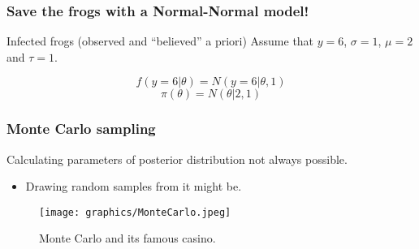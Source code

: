 \documentclass{beamer}
\newcommand{\1}{\ensuremath{\mathbf{1}}}
\begin{document}
%
%
%
\begin{frame}\frametitle{Save the frogs with a Normal-Normal model!}
	\begin{block}{Infected frogs (observed and ``believed'' a priori)}
		Assume that $y = 6$, $\sigma = 1$, $\mu = 2$ and $\tau = 1$.
	\end{block}
	\vspace{-1ex}
	\begin{equation}
		f(y = 6|\theta) = N(y=6|\theta,1)
	\end{equation}
	\begin{equation}
		\pi(\theta) = N(\theta|2, 1)
	\end{equation}
\end{frame}
%
%
%
\begin{frame}\frametitle{Monte Carlo sampling}
	Calculating parameters of posterior distribution not always possible.
	\begin{itemize}
		\item Drawing random samples from it might be.
	\end{itemize}
	\begin{figure}
	\begin{center}
		\texttt{[image: graphics/MonteCarlo.jpeg]}
	\end{center}
	\caption{Monte Carlo and its famous casino.}
	\end{figure}
\end{frame}
\end{document}
